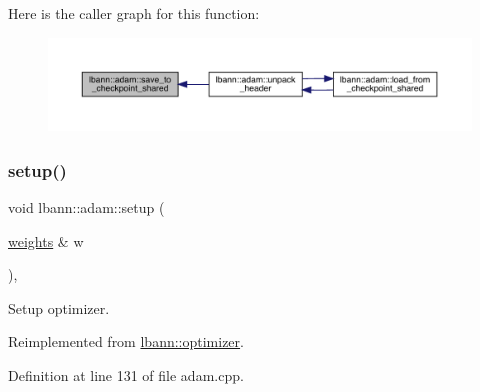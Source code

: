 Here is the caller graph for this function\+:\nopagebreak
\begin{figure}[H]
\begin{center}
\leavevmode
\includegraphics[width=350pt]{classlbann_1_1adam_a8070db0a451bdbc6e86200eaa14f6ac7_icgraph}
\end{center}
\end{figure}
\mbox{\label{classlbann_1_1adam_aea0b1fa44197fe184a6feca5ec5c808e}} 
\subsubsection{\texorpdfstring{setup()}{setup()}}
{\footnotesize\ttfamily void lbann\+::adam\+::setup (\begin{DoxyParamCaption}\item[{\hyperlink{classlbann_1_1weights}{weights} \&}]{w }\end{DoxyParamCaption})\hspace{0.3cm}{\ttfamily [override]}, {\ttfamily [virtual]}}

Setup optimizer. 

Reimplemented from \hyperlink{classlbann_1_1optimizer_a7641a88b3c166df2d974a298622b992b}{lbann\+::optimizer}.



Definition at line 131 of file adam.\+cpp.


